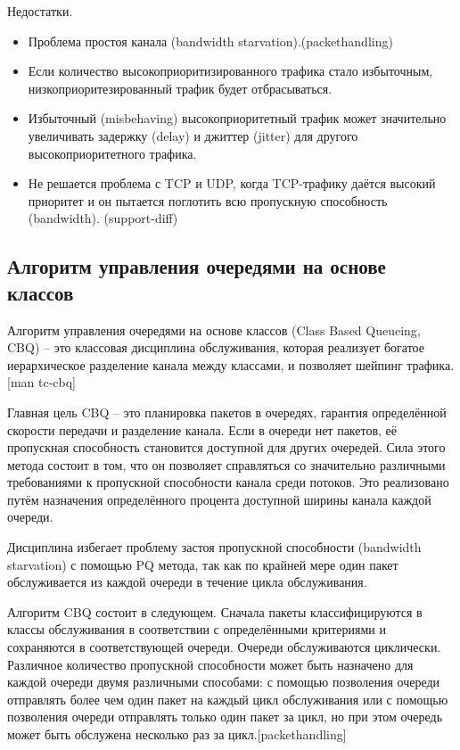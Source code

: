 	Недостатки.
	\begin{itemize}
		\item Проблема простоя канала (bandwidth starvation).(packethandling)
		\item Если количество высокоприоритизированного трафика стало избыточным,
              низкоприоритезированный трафик будет отбрасываться.
		\item Избыточный (misbehaving) высокоприоритетный трафик может значительно увеличивать
                задержку (delay) и джиттер (jitter) для другого высокоприоритетного трафика.
		\item Не решается проблема с TCP и UDP, когда TCP-трафику даётся высокий приоритет и он
                пытается поглотить всю пропускную способность (bandwidth). (support-diff)
	\end{itemize}


	\subsection{Алгоритм управления очередями на основе классов}

        Алгоритм управления очередями на основе классов (Class Based Queueing, CBQ) -- это
		классовая дисциплина обслуживания, которая реализует
        богатое иерархическое разделение канала между классами, и позволяет
		шейпинг трафика. [man tc-cbq]

        Главная цель CBQ -- это планировка пакетов в очередях, гарантия определённой
        скорости передачи и разделение канала. Если в очереди нет пакетов, её пропускная способность
        становится доступной для других очередей. Сила этого метода состоит в том, что
        он позволяет справляться со значительно различными требованиями
        к пропускной способности канала среди потоков. Это реализовано путём назначения
        определённого процента доступной ширины канала каждой очереди.
		
        Дисциплина избегает проблему застоя пропускной способности
        (bandwidth starvation) с помощью PQ метода, так как по крайней мере один пакет
        обслуживается из каждой очереди в течение цикла обслуживания.

        Алгоритм CBQ состоит в следующем. Сначала пакеты классифицируются в классы
        обслуживания в соответствии с определёнными критериями и сохраняются в
        соответствующей очереди. Очереди обслуживаются циклически. Различное
        количество пропускной способности может быть назначено для каждой очереди
        двумя различными способами: с помощью позволения очереди отправлять более
        чем один пакет на каждый цикл обслуживания или с помощью позволения очереди
        отправлять только один пакет за цикл, но при этом очередь может быть обслужена
        несколько раз за цикл.[packethandling]

